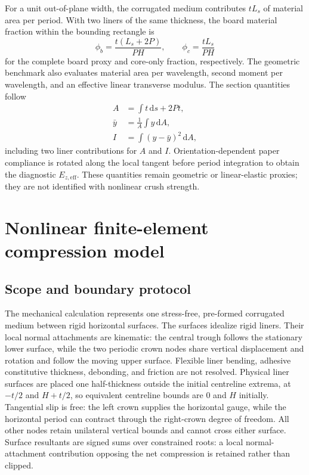 \documentclass[11pt]{article}
\newcommand{\phib}{\phi_{b}}
\newcommand{\phic}{\phi_{c}}
\begin{document}
For a unit out-of-plane width, the corrugated medium contributes $tL_s$ of material area per period. With two liners of the same thickness, the board material fraction within the bounding rectangle is
\begin{equation}
\phib=\frac{t(L_s+2P)}{PH},
\qquad
\phic=\frac{tL_s}{PH}
\label{eq:material_fraction}
\end{equation}
for the complete board proxy and core-only fraction, respectively. The geometric benchmark also evaluates material area per wavelength, second moment per wavelength, and an effective linear transverse modulus. The section quantities follow
\begin{align}
A&=\int t\,\mathrm ds+2Pt,\nonumber\\
\bar y&=\frac{1}{A}\int y\,\mathrm dA,\nonumber\\
I&=\int (y-\bar y)^2\,\mathrm dA,
\end{align}
including two liner contributions for $A$ and $I$. Orientation-dependent paper compliance is rotated along the local tangent before period integration to obtain the diagnostic $E_{z,\mathrm{eff}}$. These quantities remain geometric or linear-elastic proxies; they are not identified with nonlinear crush strength.

\section{Nonlinear finite-element compression model}

\subsection{Scope and boundary protocol}

The mechanical calculation represents one stress-free, pre-formed corrugated medium between rigid horizontal surfaces. The surfaces idealize rigid liners. Their local normal attachments are kinematic: the central trough follows the stationary lower surface, while the two periodic crown nodes share vertical displacement and rotation and follow the moving upper surface. Flexible liner bending, adhesive constitutive thickness, debonding, and friction are not resolved. Physical liner surfaces are placed one half-thickness outside the initial centreline extrema, at $-t/2$ and $H+t/2$, so equivalent centreline bounds are $0$ and $H$ initially. Tangential slip is free: the left crown supplies the horizontal gauge, while the horizontal period can contract through the right-crown degree of freedom. All other nodes retain unilateral vertical bounds and cannot cross either surface. Surface resultants are signed sums over constrained roots: a local normal-attachment contribution opposing the net compression is retained rather than clipped.
\end{document}
